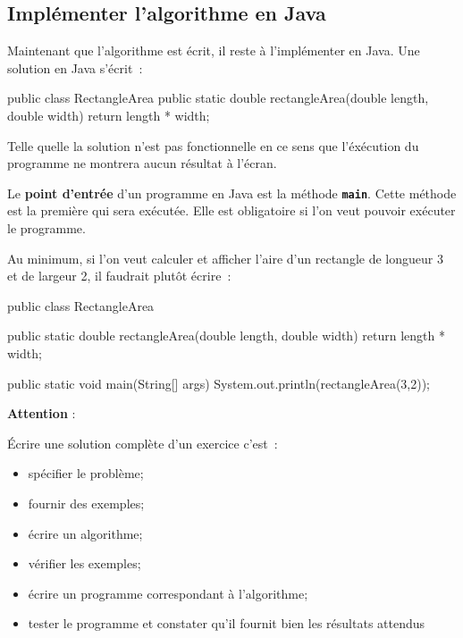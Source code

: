 		\subsection{Implémenter l'algorithme en Java}

			Maintenant que l'algorithme est écrit, il reste à l'implémenter en 
			Java. Une solution en Java s'écrit~:

			\begin{java}
public class RectangleArea{
	public static double rectangleArea(double length, double width){
		return length * width;
	}
}			
			\end{java}

			Telle quelle la solution n'est pas fonctionnelle en ce sens que 
			l'éxécution du programme ne montrera aucun résultat à l'écran. 
			
			Le \textbf{point d'entrée} d'un programme en
			Java est la méthode \textbf{\texttt{main}}. Cette méthode est la
			première qui sera exécutée. Elle est obligatoire si l'on veut pouvoir
			exécuter le programme. 

			Au minimum, si l'on veut calculer et afficher l'aire d'un rectangle
			de longueur 3 et de largeur 2, il faudrait plutôt écrire~:

			\begin{java}
public class RectangleArea{
	public static double rectangleArea(double length, double width){
		return length * width;
	}

	public static void main(String[] args){
		System.out.println(rectangleArea(3,2));
	}
}
			\end{java}


			\bigskip
			\textbf{Attention} : 
	
			Écrire une solution complète d'un exercice c'est~:
			\begin{itemize}
				\item spécifier le problème;
				\item fournir des exemples;
				\item écrire un algorithme;
				\item vérifier les exemples;
				\item écrire un programme correspondant à l'algorithme;
				\item tester le programme et constater qu'il fournit bien les 
					résultats attendus
			\end{itemize}


